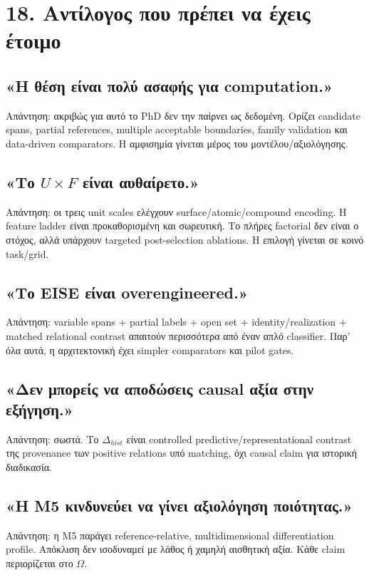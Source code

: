 \documentclass[9pt,a4paper]{extarticle}
\begin{document}
\newpage
\section*{18. Αντίλογος που πρέπει να έχεις έτοιμο}

\subsection*{«Η θέση είναι πολύ ασαφής για computation.»}
Απάντηση: ακριβώς για αυτό το PhD δεν την παίρνει ως δεδομένη. Ορίζει candidate spans, partial references, multiple acceptable boundaries, family validation και data-driven comparators. Η αμφισημία γίνεται μέρος του μοντέλου/αξιολόγησης.

\subsection*{«Το \(U\times F\) είναι αυθαίρετο.»}
Απάντηση: οι τρεις unit scales ελέγχουν surface/atomic/compound encoding. Η feature ladder είναι προκαθορισμένη και σωρευτική. Το πλήρες factorial δεν είναι ο στόχος, αλλά υπάρχουν targeted post-selection ablations. Η επιλογή γίνεται σε κοινό task/grid.

\subsection*{«Το EISE είναι overengineered.»}
Απάντηση: variable spans + partial labels + open set + identity/realization + matched relational contrast απαιτούν περισσότερα από έναν απλό classifier. Παρ' όλα αυτά, η αρχιτεκτονική έχει simpler comparators και pilot gates.

\subsection*{«Δεν μπορείς να αποδώσεις causal αξία στην εξήγηση.»}
Απάντηση: σωστά. Το \(\Delta_{hist}\) είναι controlled predictive/representational contrast της provenance των positive relations υπό matching, όχι causal claim για ιστορική διαδικασία.

\subsection*{«Η M5 κινδυνεύει να γίνει αξιολόγηση ποιότητας.»}
Απάντηση: η M5 παράγει reference-relative, multidimensional differentiation profile. Απόκλιση δεν ισοδυναμεί με λάθος ή χαμηλή αισθητική αξία. Κάθε claim περιορίζεται στο \(\Omega\).
\end{document}

